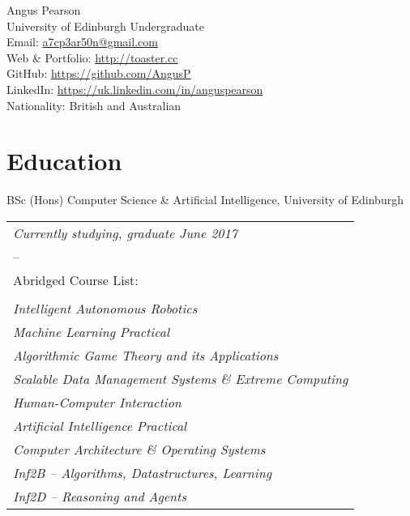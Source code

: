 \documentclass[10pt, a4paper]{article}
\newcommand{\years}[1]{\marginnote{\scriptsize #1}}
\begin{document}
{\huge Angus Pearson}\\[1cm]
University of Edinburgh Undergraduate\\

Email: \href{mailto:a7cp3ar50n@gmail.com}{a7cp3ar50n@gmail.com}\\
Web \& Portfolio:   \href{http://toaster.cc}{http://toaster.cc}\\
GitHub: \href{https://github.com/AngusP}{https://github.com/AngusP} \\
LinkedIn: \href{https://uk.linkedin.com/in/anguspearson}{https://uk.linkedin.com/in/anguspearson}\\


Nationality:  British and Australian

\section*{Education}

\years{2013-2017} BSc (Hons) Computer Science \& Artificial Intelligence, University of Edinburgh\\

\begin{tabular}{l}
  \emph{Currently studying, graduate June 2017} \\
  --\\
  Abridged Course List:\\
  \\
  \emph{Intelligent Autonomous Robotics}\\
  \emph{Machine Learning Practical}\\
  \emph{Algorithmic Game Theory and its Applications}\\
  \emph{Scalable Data Management Systems \& Extreme Computing}\\
  \emph{Human-Computer Interaction}\\
  \emph{Artificial Intelligence Practical}\\
  \emph{Computer Architecture \& Operating Systems}\\
  \emph{Inf2B -- Algorithms, Datastructures, Learning}\\
  \emph{Inf2D -- Reasoning and Agents}\\
\end{tabular}\\
\end{document}
